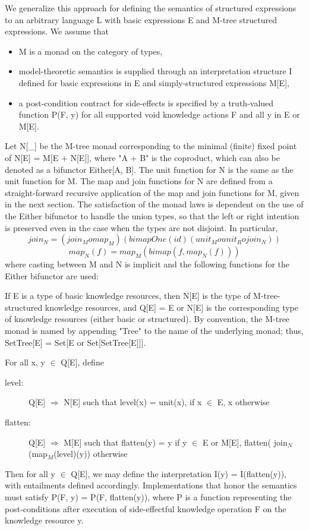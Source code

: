 \documentclass[runningheads]{llncs}
\begin{document}
We generalize this approach for defining the semantics of structured expressions to an arbitrary language L with basic expressions E and M-tree structured expressions. We assume that 
\begin{itemize}
\item M is a monad on the category of types,
\item model-theoretic semantics is supplied through an interpretation structure I defined for basic expressions in E and simply-structured expressions M[E],
\item a post-condition contract for side-effects is specified by a truth-valued function P(F, y) for all supported void knowledge actions F and all y in E or M[E].
\end{itemize}

Let N[\_] be the M-tree monad corresponding to the minimal (finite) fixed point of N[E] = M[E + N[E]], where "A + B" is the coproduct, which can also be denoted as a bifunctor Either[A, B].
The unit function for N is the same as the unit function for M.
The map and join functions for N are defined from a straight-forward recursive application of the map and join functions for M, given in the next section.
The satisfaction of the monad laws is dependent on the use of the Either bifunctor to handle the union types, so that the left or right intention is preserved even in the case when the types are not disjoint. In particular,
$$join_N = (join_M o map_M)( bimapOne( id) (unit_M o unit_R o join_N) ) $$
$$ map_N(f) = map_M( bimap(f, map_N(f)) ) $$
 where casting between M and N is implicit and the following functions for the Either bifunctor are used:
 
If E is a type of basic knowledge resources, then N[E] is the type of M-tree-structured knowledge resources, and
Q[E] = E or N[E] is the corresponding type of knowledge resources (either basic or structured). By convention, the M-tree monad is named by appending "Tree" to the name of the underlying monad; thus, SetTree[E] = Set[E or Set[SetTree[E]]].

For all x, y $\in$ Q[E], define
\begin{description}
\item[level:] Q[E] $\Rightarrow$ N[E]
such that level(x) = unit(x), if x $\in$ E, x otherwise
\item[flatten:] Q[E] $\Rightarrow$ M[E]  
such that flatten(y) = y if y $\in$  E or M[E], flatten( join$_N$(map$_M$(level)(y)) otherwise
\end{description}
Then for all y $\in$ Q[E], we may define the interpretation I(y) = I(flatten(y)), with entailments defined accordingly. %
Implementations that honor the semantics must satisfy P(F, y) = P(F, flatten(y)), where P is a function representing the post-conditions after execution of side-effectful knowledge operation F on the knowledge resource y.
\end{document}
